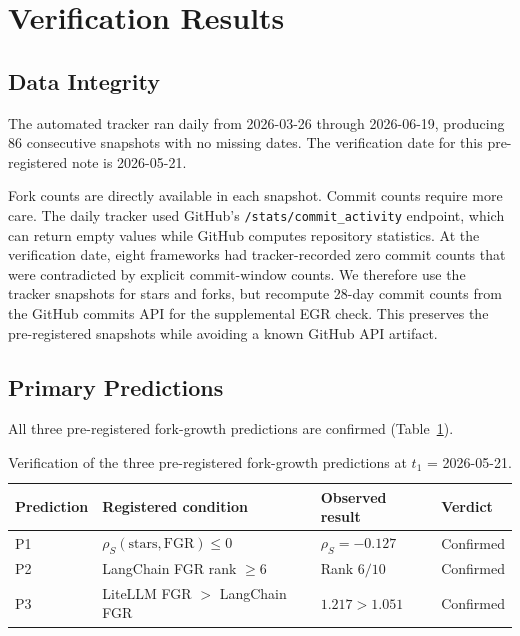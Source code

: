 \documentclass[12pt]{article}
\begin{document}
\section{Verification Results}

\subsection{Data Integrity}

The automated tracker ran daily from 2026-03-26 through 2026-06-19, producing 86 consecutive snapshots with no missing dates. The verification date for this pre-registered note is 2026-05-21.

Fork counts are directly available in each snapshot. Commit counts require more care. The daily tracker used GitHub's \texttt{/stats/commit\_activity} endpoint, which can return empty values while GitHub computes repository statistics. At the verification date, eight frameworks had tracker-recorded zero commit counts that were contradicted by explicit commit-window counts. We therefore use the tracker snapshots for stars and forks, but recompute 28-day commit counts from the GitHub commits API for the supplemental EGR check. This preserves the pre-registered snapshots while avoiding a known GitHub API artifact.

\subsection{Primary Predictions}

All three pre-registered fork-growth predictions are confirmed (Table~\ref{tab:prediction-results}).

\begin{table}[h]
\centering
\caption{Verification of the three pre-registered fork-growth predictions at $t_1$ = 2026-05-21.}
\label{tab:prediction-results}
\begin{tabular}{llll}
\toprule
Prediction & Registered condition & Observed result & Verdict \\
\midrule
P1 & $\rho_S(\text{stars}, \text{FGR}) \leq 0$ & $\rho_S = -0.127$ & Confirmed \\
P2 & LangChain FGR rank $\geq 6$ & Rank $6/10$ & Confirmed \\
P3 & LiteLLM FGR $>$ LangChain FGR & $1.217 > 1.051$ & Confirmed \\
\bottomrule
\end{tabular}
\end{table}
\end{document}
